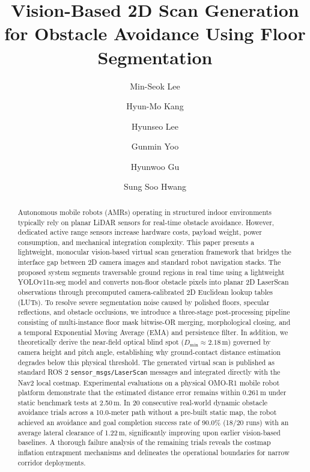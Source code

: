 \documentclass[preprint,12pt]{elsarticle}
\begin{document}
\begin{frontmatter}

\title{Vision-Based 2D Scan Generation for Obstacle Avoidance Using Floor Segmentation}

\author[inst1]{Min-Seok Lee}
\author[inst1]{Hyun-Mo Kang}
\author[inst1]{Hyunseo Lee}
\author[inst1]{Gunmin Yoo}
\author[inst1]{Hyunwoo Gu}
\author[inst1]{Sung Soo Hwang}



\begin{abstract}
Autonomous mobile robots (AMRs) operating in structured indoor environments typically rely on planar LiDAR sensors for real-time obstacle avoidance. However, dedicated active range sensors increase hardware costs, payload weight, power consumption, and mechanical integration complexity. This paper presents a lightweight, monocular vision-based virtual scan generation framework that bridges the interface gap between 2D camera images and standard robot navigation stacks. The proposed system segments traversable ground regions in real time using a lightweight YOLOv11n-seg model and converts non-floor obstacle pixels into planar 2D LaserScan observations through precomputed camera-calibrated 2D Euclidean lookup tables (LUTs). To resolve severe segmentation noise caused by polished floors, specular reflections, and obstacle occlusions, we introduce a three-stage post-processing pipeline consisting of multi-instance floor mask bitwise-OR merging, morphological closing, and a temporal Exponential Moving Average (EMA) and persistence filter. In addition, we theoretically derive the near-field optical blind spot ($D_{\min} \approx 2.18$\,m) governed by camera height and pitch angle, establishing why ground-contact distance estimation degrades below this physical threshold. The generated virtual scan is published as standard ROS 2 \texttt{sensor\_msgs/LaserScan} messages and integrated directly with the Nav2 local costmap. Experimental evaluations on a physical OMO-R1 mobile robot platform demonstrate that the estimated distance error remains within 0.261\,m under static benchmark tests at 2.50\,m. In 20 consecutive real-world dynamic obstacle avoidance trials across a 10.0-meter path without a pre-built static map, the robot achieved an avoidance and goal completion success rate of 90.0\% (18/20 runs) with an average lateral clearance of 1.22\,m, significantly improving upon earlier vision-based baselines. A thorough failure analysis of the remaining trials reveals the costmap inflation entrapment mechanisms and delineates the operational boundaries for narrow corridor deployments.
\end{abstract}


\end{frontmatter}
\end{document}
